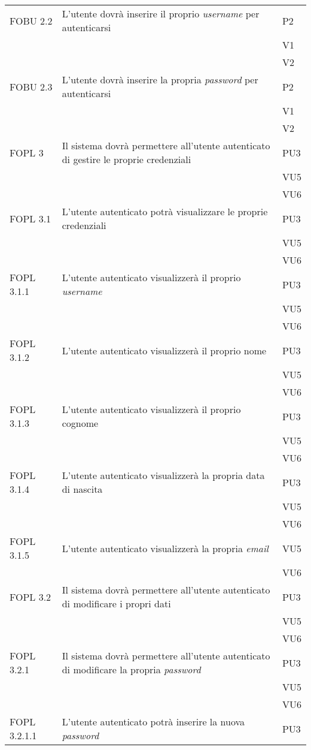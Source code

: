 \begin{longtable}{lXp{}}
\midrule 
FOBU 2.2&L'utente dovrà inserire il proprio \textit{username} per autenticarsi&P2\\ 
&&V1\\ 
&&V2\\
\midrule 
FOBU 2.3&L'utente dovrà inserire la propria \textit{password} per autenticarsi&P2\\
&&V1\\ 
&&V2\\ 
\midrule 
FOPL 3&Il sistema dovrà permettere all'utente autenticato di gestire le proprie credenziali&PU3\\ 
&&VU5\\ 
&&VU6\\ 
\midrule
FOPL 3.1&L'utente autenticato potrà visualizzare le proprie credenziali&PU3\\ 
&&VU5\\ 
&&VU6\\ 
\midrule 
FOPL 3.1.1&L'utente autenticato visualizzerà il proprio \textit{username}&PU3\\ 
&&VU5\\ 
&&VU6\\ 
\midrule 
FOPL 3.1.2&L'utente autenticato visualizzerà il proprio nome&PU3\\ 
&&VU5\\ 
&&VU6\\ 
\midrule 
FOPL 3.1.3&L'utente autenticato visualizzerà il proprio cognome&PU3\\ 
&&VU5\\ 
&&VU6\\ 
\midrule 
FOPL 3.1.4&L'utente autenticato visualizzerà la propria data di nascita&PU3\\ 
&&VU5\\ 
&&VU6\\
\midrule
FOPL 3.1.5&L'utente autenticato visualizzerà la propria \textit{email}&VU5\\ 
&&VU6\\ 
\midrule 
FOPL 3.2&Il sistema dovrà permettere all'utente autenticato di modificare i propri dati&PU3\\ 
&&VU5\\ 
&&VU6\\ 
\midrule 
FOPL 3.2.1&Il sistema dovrà permettere all'utente autenticato di modificare la propria \textit{password}&PU3\\ 
&&VU5\\ 
&&VU6\\ 
\midrule 
FOPL 3.2.1.1&L'utente autenticato potrà inserire la nuova \textit{password}&PU3\\ 

\end{longtable}
